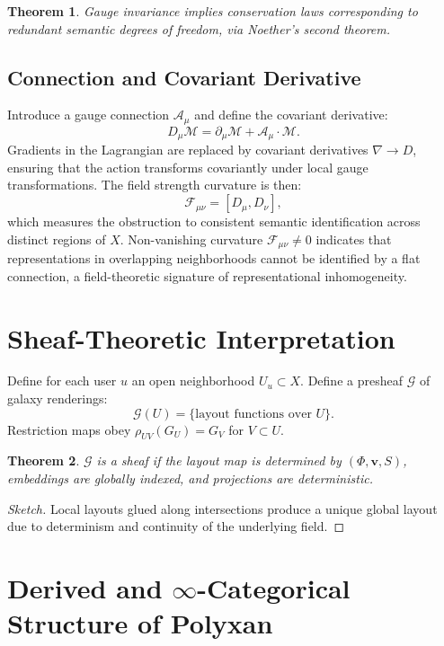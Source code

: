 \documentclass[11pt]{article}
\newtheorem{theorem}{Theorem}[section]
\begin{document}
\begin{theorem}
Gauge invariance implies conservation laws corresponding to redundant
semantic degrees of freedom, via Noether's second theorem.
\end{theorem}

\subsection{Connection and Covariant Derivative}

Introduce a gauge connection $\mathcal{A}_\mu$ and define the covariant
derivative:
\[
D_\mu \mathcal{M}
=
\partial_\mu \mathcal{M}
+
\mathcal{A}_\mu \cdot \mathcal{M}.
\]
Gradients in the Lagrangian are replaced by covariant derivatives
$\nabla \to D$, ensuring that the action transforms covariantly under
local gauge transformations.
The field strength curvature is then:
\[
\mathcal{F}_{\mu\nu}
=
[D_\mu, D_\nu],
\]
which measures the obstruction to consistent semantic identification
across distinct regions of $X$.
Non-vanishing curvature $\mathcal{F}_{\mu\nu} \neq 0$ indicates that
representations in overlapping neighborhoods cannot be identified by a
flat connection, a field-theoretic signature of representational
inhomogeneity.

\section{Sheaf-Theoretic Interpretation}

Define for each user $u$ an open neighborhood $U_u\subset X$.
Define a presheaf $\mathscr{G}$ of galaxy renderings:
\[
\mathscr{G}(U)=\{\text{layout functions over }U\}.
\]
Restriction maps obey $\rho_{UV}(G_U)=G_V$ for $V\subset U$.

\begin{theorem}
$\mathscr{G}$ is a sheaf if the layout map is determined by
$(\Phi,\mathbf{v},S)$, embeddings are globally indexed, and projections
are deterministic.
\end{theorem}

\begin{proof}[Sketch]
Local layouts glued along intersections produce a unique global layout due
to determinism and continuity of the underlying field.
\end{proof}

\section{Derived and $\infty$-Categorical Structure of Polyxan}
\label{sec:derived}
\end{document}
